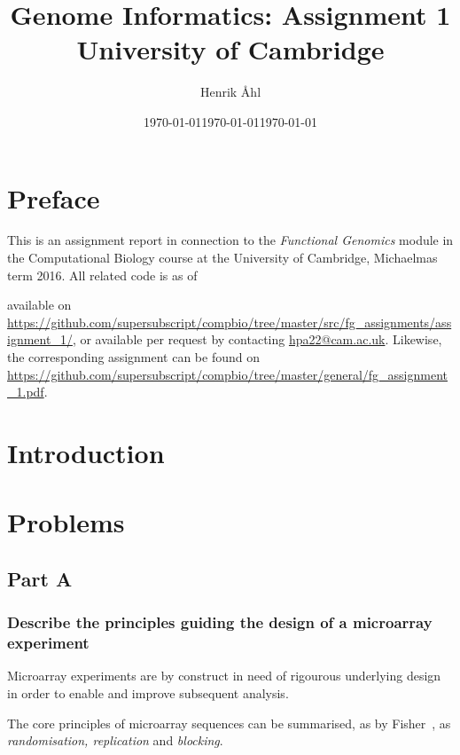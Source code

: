 \documentclass[10pt]{article}\usepackage[]{graphicx}\usepackage[]{color}
\title
{
  \phantom{a}\vspace{2cm}
	\textbf
	{
      Genome Informatics: Assignment 1
  }\\[1em]
  \small{University of Cambridge}
}
\author{Henrik Åhl}
\date{\today}
\theoremstyle{plain}
\theoremstyle{definition}
\begin{document}
\date{\today}
\maketitle
\thispagestyle{empty}
\newpage
\setcounter{page}{1}

\section*{Preface}
This is an assignment report in connection to the \textit{Functional Genomics} module in the Computational Biology course at the University of Cambridge, Michaelmas term 2016. All related code is as of \date{\today} available on \url{https://github.com/supersubscript/compbio/tree/master/src/fg_assignments/assignment_1/}, or available per request by contacting \href{mailto:hpa22@cam.ac.uk}{hpa22@cam.ac.uk}. Likewise, the corresponding assignment can be found on \url{https://github.com/supersubscript/compbio/tree/master/general/fg_assignment_1.pdf}.

\section{Introduction}

\section{Problems}
\subsection*{Part A}
\subsubsection*{Describe the principles guiding the design of a microarray
experiment}

Microarray experiments are by construct in need of rigourous underlying design in order to enable and improve subsequent analysis. 

The core principles of microarray sequences can be summarised, as by Fisher~\cite{fisher1960}, as \textit{randomisation, replication} and \textit{blocking}.
\end{document}
